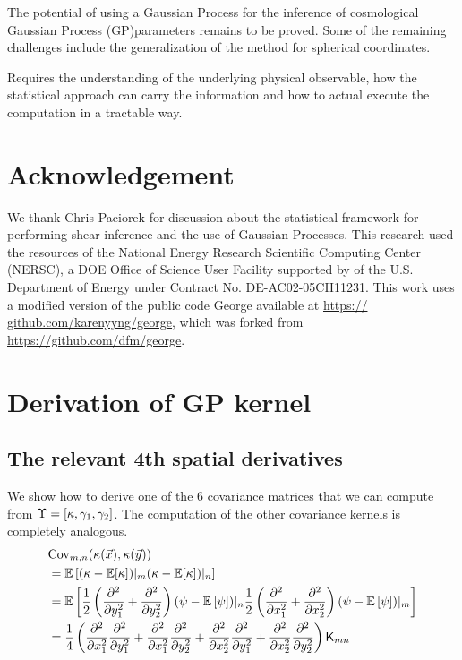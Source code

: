 The potential of using a Gaussian Process for the inference of cosmological 
Gaussian Process (GP)parameters remains to be proved. 
Some of the remaining challenges include the generalization of the method for spherical
coordinates. 


Requires the understanding of the underlying physical observable, how the statistical
approach can carry the information and how to actual execute the computation in
a tractable way.


\section{Acknowledgement}
We thank Chris Paciorek for discussion about the statistical
framework for performing shear inference and the
use of Gaussian Processes.
This research
used the resources of the National Energy Research Scientific 
Computing Center (NERSC), a DOE Office of Science
User Facility supported by 
of the U.S. Department of Energy under Contract No.
DE-AC02-05CH11231.
 This work uses a modified version
of the public code {\sc George} available at \href{https://
github.com/karenyyng/george}{https://
github.com/karenyyng/george}, which was forked from \\
\href{https://github.com/dfm/george}{https://github.com/dfm/george}.



\appendix 

\section{Derivation of GP kernel}


\subsection{The relevant 4th spatial derivatives}
We show how to derive one of the 6  covariance matrices that we can compute
from $\Upsilon = [\kappa, \gamma_1, \gamma_2]$. The computation of the other
covariance kernels is completely analogous.
\begin{align*}
&{\rm Cov}_{m,n} (\kappa(\vec{x}), \kappa(\vec{y}))  \\ 
&= \mathbb{E} \left[ 
	(\kappa - \mathbb{E}[\kappa])|_m 
( \kappa - \mathbb{E}[\kappa])|_n\right] 
\\
 &=\mathbb{E}\left[
\frac{1}{2} \left(\frac{\partial^2}{\partial y_1^2} + 
\frac{\partial^2}{\partial y_2^2}\right) 
 (\psi - \mathbb{E}\left[\psi\right])|_n \frac{1}{2}
\left(\frac{\partial^2}{\partial x_1^2} + \frac{\partial^2}{\partial x_2^2} \right)
(\psi - \mathbb{E}\left[\psi\right])|_m \right]
\\
&= \frac{1}{4}\left(
\frac{\partial^2}{\partial x_1^2} \frac{\partial^2}{\partial y_1^2} + 
\frac{\partial^2}{\partial x_1^2} \frac{\partial^2}{\partial y_2^2} +  
\frac{\partial^2}{\partial x_2^2} \frac{\partial^2}{\partial y_1^2} + 
\frac{\partial^2}{\partial x_2^2} \frac{\partial^2}{\partial y_2^2}  
\right) \mathsf{K}_{mn}\\ 
\end{align*}


